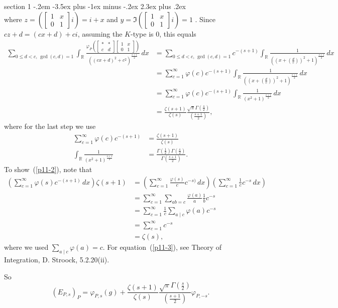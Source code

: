\documentclass[12pt]{article}
\makeatletter
\theoremstyle{norm}
\newcommand{\R}[0]{\mathbb{R}}
\newcommand{\Z}[0]{\mathbb{Z}}
\newcommand{\rc}[1]{\frac{1}{#1}}
\newcommand{\ga}[0]{\gamma}
\newcommand{\Ga}[0]{\Gamma}
\newcommand{\ph}[0]{\varphi}
\newcommand{\pa}[1]{\left( {#1} \right)}
\newcommand{\pf}[2]{\pa{\frac{#1}{#2}}}
\newcommand{\matt}[4]{
\left[
\begin{matrix}
{#1}&{#2}\\
{#3}&{#4}
\end{matrix}
\right]}
\newcommand{\iy}[0]{\infty}
\newcommand{\ir}[0]{\int_{\R}}
\newenvironment{problem}{\@startsection
       {section}
       {1}
       {-.2em}
       {-3.5ex plus -1ex minus -.2ex}
       {2.3ex plus .2ex}
       {\pagebreak[3]%
       \large\bf\noindent{Problem }
       }
       }
       {
       }
\makeatother
\begin{document}
\begin{problem}{\it }
\[\]
where $z=\pa{\matt 1x01 i}=i+x$ and $y=\Im\pa{\matt 1x01 i}=1$%
. Since $cz+d=(cx+d)+ci$, assuming the $K$-type is 0, this equals 
\begin{align*}
\sum_{0\le d<c,\,\gcd(c,d)=1}\ir \frac{\ph_{P} \pa{\matt **cd\matt 1x01}}{((cx+d)^2+c^2)^{\frac{s+1}2}}\,dx
&=\sum_{0\le d<c,\,\gcd(c,d)=1}c^{-(s+1)} \ir \rc{\pa{\pa{x+\pf dc}^2+1}^{\frac{s+1}{2}}}\,dx\\
&=\sum_{c=1}^{\iy}\ph(c)c^{-(s+1)} \ir\rc{\pa{\pa{x+\pf dc}^2+1}^{\frac{s+1}{2}}}\,dx\\
&=\sum_{c=1}^{\iy}\ph(c)c^{-(s+1)} \ir \rc{(x^2+1)^{\frac{s+1}{2}}}\,dx\\
&=\frac{\zeta(s+1)}{\zeta(s)}\frac{\sqrt{\pi}\Ga\pf s2}{\pf{s+1}{2}},
\end{align*} 
where for the last step we use
\begin{align}
\label{p11-2}
\sum_{c=1}^{\iy} \ph(c)c^{-(s+1)}&=\frac{\zeta(s+1)}{\zeta(s)}\\
\label{p11-3}
\ir \rc{(x^2+1)^{\frac {s+1}2}}&=\frac{\Ga\pf 12\Ga\pf s2}{\Ga\pf{s+1}{2}}.
\end{align}
To show~(\ref{p11-2}), note that
\begin{align*}
\pa{\sum_{c=1}^{\iy} \ph(s)c^{-(s+1)}\,dx}
\zeta(s+1)
&=\pa{\sum_{c=1}^{\iy} 
\frac{\ph(s)}{c}c^{-s)}\,dx}
\pa{\sum_{c=1}^{\iy}\rc{c} c^{-s}\,dx}\\
&=\sum_{c=1}^{\iy} \sum_{ab=c} \frac{\ph(a)}{a}\rc{b}c^{-s}\\
&=\sum_{c=1}^{\iy} \rc{c}\sum_{a\mid c} \ph(a)c^{-s}\\
&=\sum_{c=1}^{\iy} c^{-s}\\
&=\zeta(s),
\end{align*}
where we used $\sum_{a\mid c} \ph(a)=c$. For equation~(\ref{p11-3}), see Theory of Integration, D. Stroock, 5.2.20(ii).

So
\[
(E_{P,s})_P=\ph_{P,s}(g)+\frac{\zeta(s+1)}{\zeta(s)}\frac{\sqrt{\pi}\Ga\pf s2}{\pf{s+1}{2}}\ph_{P,-s}.
\]


\end{problem}
\end{document}
